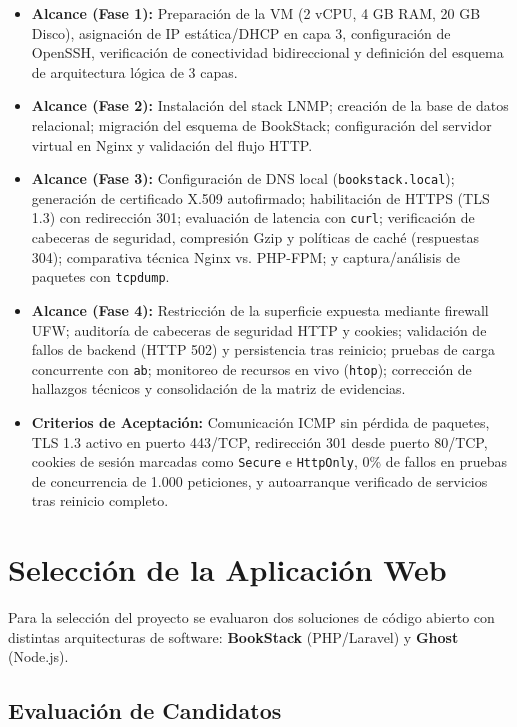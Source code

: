 \documentclass[12pt,a4paper]{article}
\begin{document}
\begin{itemize}
    \item \textbf{Alcance (Fase 1):} Preparación de la VM (2 vCPU, 4 GB RAM, 20 GB Disco), asignación de IP estática/DHCP en capa 3, configuración de OpenSSH, verificación de conectividad bidireccional y definición del esquema de arquitectura lógica de 3 capas.
    \item \textbf{Alcance (Fase 2):} Instalación del stack LNMP; creación de la base de datos relacional; migración del esquema de BookStack; configuración del servidor virtual en Nginx y validación del flujo HTTP.
    \item \textbf{Alcance (Fase 3):} Configuración de DNS local (\texttt{bookstack.local}); generación de certificado X.509 autofirmado; habilitación de HTTPS (TLS 1.3) con redirección 301; evaluación de latencia con \texttt{curl}; verificación de cabeceras de seguridad, compresión Gzip y políticas de caché (respuestas 304); comparativa técnica Nginx vs. PHP-FPM; y captura/análisis de paquetes con \texttt{tcpdump}.
    \item \textbf{Alcance (Fase 4):} Restricción de la superficie expuesta mediante firewall UFW; auditoría de cabeceras de seguridad HTTP y cookies; validación de fallos de backend (HTTP 502) y persistencia tras reinicio; pruebas de carga concurrente con \texttt{ab}; monitoreo de recursos en vivo (\texttt{htop}); corrección de hallazgos técnicos y consolidación de la matriz de evidencias.
    \item \textbf{Criterios de Aceptación:} Comunicación ICMP sin pérdida de paquetes, TLS 1.3 activo en puerto 443/TCP, redirección 301 desde puerto 80/TCP, cookies de sesión marcadas como \texttt{Secure} e \texttt{HttpOnly}, 0\% de fallos en pruebas de concurrencia de 1.000 peticiones, y autoarranque verificado de servicios tras reinicio completo.
\end{itemize}

\section{Selección de la Aplicación Web}

Para la selección del proyecto se evaluaron dos soluciones de código abierto con distintas arquitecturas de software: \textbf{BookStack} (PHP/Laravel) y \textbf{Ghost} (Node.js).

\subsection{Evaluación de Candidatos}
\end{document}
